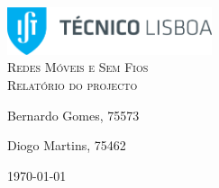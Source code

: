 \begin{titlepage}

	\begin{center}

		\includegraphics[width=6cm]{./title}\\[3cm]

		\textsc{\LARGE Redes Móveis e Sem Fios}\\[1.5cm]

		\textsc{\Large Relatório do projecto}\\[1.5cm]


		


		\noindent
		\begin{minipage}{0.4\textwidth}
			\begin{flushleft} \large
				Bernardo Gomes, 75573
			\end{flushleft}
		\end{minipage}
		\begin{minipage}{0.4\textwidth}
			\begin{flushright} \large
				Diogo Martins, 75462
			\end{flushright}
		\end{minipage}

		\vfill

		{\large \today}


	\end{center}

\end{titlepage}